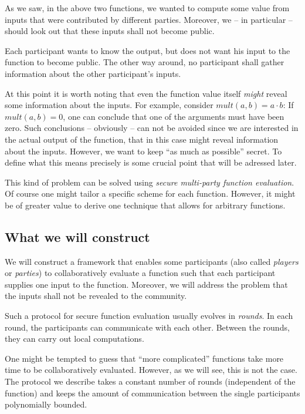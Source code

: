 \message{ !name(seminar.tex)}\documentclass{llncs}
\begin{document}
As we saw, in the above two functions, we wanted to compute some value from inputs that were contributed by different parties. Moreover, we -- in particular -- should look out that these inputs shall not become public.

Each participant wants to know the output, but does not want his input to the function to become public. The other way around, no participant shall gather information about the other participant's inputs.

At this point it is worth noting that even the function value itself \emph{might} reveal some information about the inputs. For example, consider $mult(a,b)=a\cdot b$: If $mult(a,b)=0$, one can conclude that one of the arguments must have been zero. Such conclusions -- obviously -- can not be avoided since we are interested in the actual output of the function, that in this case might reveal information about the inputs. However, we want to keep ``as much as possible'' secret. To define what this means precisely is some crucial point that will be adressed later.

This kind of problem can be solved using \emph{secure multi-party function evaluation}. Of course one might tailor a specific scheme for each function. However, it might be of greater value to derive one technique that allows for arbitrary functions.

\subsection{What we will construct}
\label{sec:our-goal}

We will construct a framework that enables some participants (also called \emph{players} or \emph{parties}) to collaboratively evaluate a function such that each participant supplies one input to the function. Moreover, we will address the problem that the inputs shall not be revealed to the community.

Such a protocol for secure function evaluation usually evolves in \emph{rounds}. In each round, the participants can communicate with each other. Between the rounds, they can carry out local computations.

One might be tempted to guess that ``more complicated'' functions take more time to be collaboratively evaluated. However, as we will see, this is not the case. The protocol we describe takes a constant number of rounds (independent of the function) and keeps the amount of communication between the single participants polynomially bounded.
\end{document}

